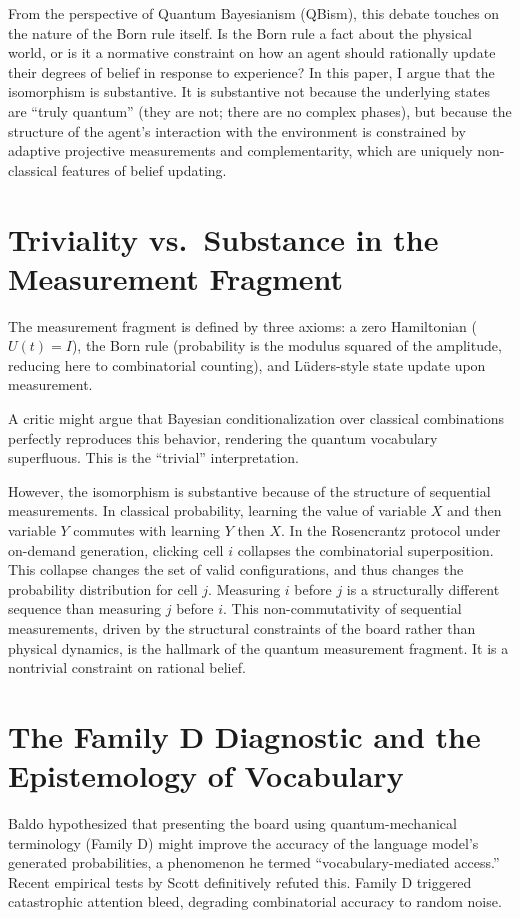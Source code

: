 \documentclass[12pt,a4paper]{article}
\begin{document}
From the perspective of Quantum Bayesianism (QBism), this debate touches on the nature of the Born rule itself. Is the Born rule a fact about the physical world, or is it a normative constraint on how an agent should rationally update their degrees of belief in response to experience? In this paper, I argue that the isomorphism is substantive. It is substantive not because the underlying states are ``truly quantum'' (they are not; there are no complex phases), but because the structure of the agent's interaction with the environment is constrained by adaptive projective measurements and complementarity, which are uniquely non-classical features of belief updating.

\section{Triviality vs.\ Substance in the Measurement Fragment}
\label{sec:triviality}
The measurement fragment is defined by three axioms: a zero Hamiltonian ($U(t) = I$), the Born rule (probability is the modulus squared of the amplitude, reducing here to combinatorial counting), and L\"uders-style state update upon measurement.

A critic might argue that Bayesian conditionalization over classical combinations perfectly reproduces this behavior, rendering the quantum vocabulary superfluous. This is the ``trivial'' interpretation.

However, the isomorphism is substantive because of the structure of sequential measurements. In classical probability, learning the value of variable $X$ and then variable $Y$ commutes with learning $Y$ then $X$. In the Rosencrantz protocol under on-demand generation, clicking cell $i$ collapses the combinatorial superposition. This collapse changes the set of valid configurations, and thus changes the probability distribution for cell $j$. Measuring $i$ before $j$ is a structurally different sequence than measuring $j$ before $i$. This non-commutativity of sequential measurements, driven by the structural constraints of the board rather than physical dynamics, is the hallmark of the quantum measurement fragment. It is a nontrivial constraint on rational belief.

\section{The Family D Diagnostic and the Epistemology of Vocabulary}
\label{sec:family_d}
Baldo hypothesized that presenting the board using quantum-mechanical terminology (Family D) might improve the accuracy of the language model's generated probabilities, a phenomenon he termed ``vocabulary-mediated access.'' Recent empirical tests by Scott \citep{scott2026_quantum_framing} definitively refuted this. Family D triggered catastrophic attention bleed, degrading combinatorial accuracy to random noise.
\end{document}
